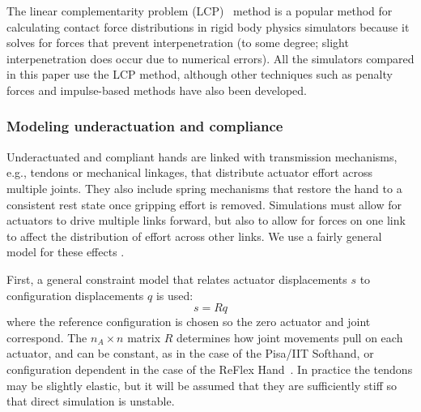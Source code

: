 The linear complementarity problem (LCP)~\cite{Anitescu97} method is a popular method for calculating contact force distributions in rigid body physics simulators because it solves for forces that prevent interpenetration (to some degree; slight interpenetration does occur due to numerical errors).  All the simulators compared in this paper use the LCP method, although other techniques such as penalty forces and impulse-based methods have also been developed.


\subsubsection{Modeling underactuation and compliance}

Underactuated and compliant hands are linked with transmission mechanisms, e.g., tendons or mechanical linkages, that distribute actuator effort across multiple joints. They also include spring mechanisms that restore the hand to a consistent rest state once gripping effort is removed.  Simulations must allow for actuators to drive multiple links forward, but also to allow for forces on one link to affect the distribution of effort across other links. We use a fairly general model for these effects \cite{Grioli12}.

First, a general constraint model that relates actuator displacements $s$ to configuration displacements $q$ is used:
\begin{equation}
\label{eq:quasi_static_equilibrium_0}
s = R q
\end{equation}
where the reference configuration is chosen so the zero actuator and joint correspond. The $n_A \times n$ matrix $R$ determines how joint movements pull on each actuator, and can be constant, as in the case of the Pisa/IIT Softhand, or configuration dependent in the case of the ReFlex Hand~\cite{Birglen11}.  In practice the tendons may be slightly elastic, but it will be assumed that they are sufficiently stiff so that direct simulation is unstable. 


